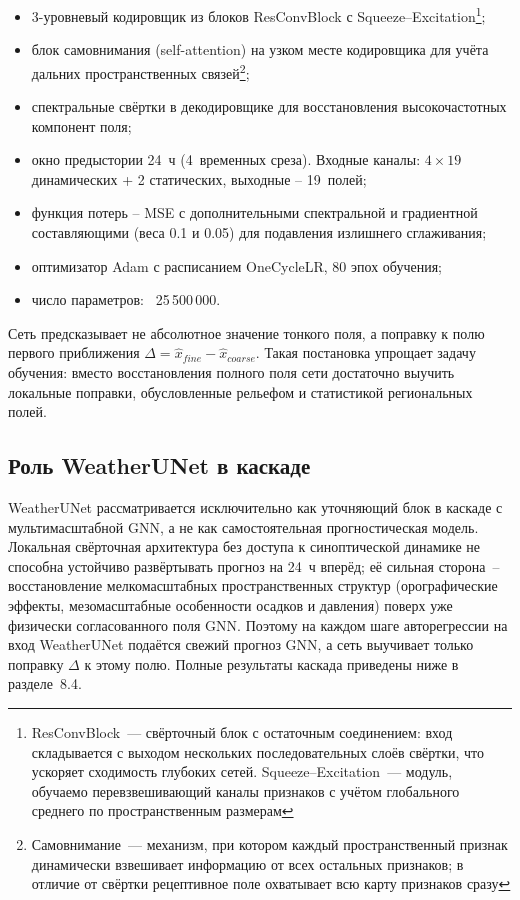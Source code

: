 \documentclass[14pt,a4paper]{extarticle}
\numberwithin{table}{section}
\numberwithin{figure}{section}
\numberwithin{equation}{section}
\providecommand{\tightlist}{%
  \setlength{\itemsep}{0pt}\setlength{\parskip}{0pt}}
\begin{document}
\begin{itemize}
\tightlist
\item
  3-уровневый кодировщик из блоков ResConvBlock с
  Squeeze--Excitation\footnote{ResConvBlock~--- свёрточный блок с
  остаточным соединением: вход складывается с выходом нескольких
  последовательных слоёв свёртки, что ускоряет сходимость глубоких
  сетей. Squeeze--Excitation~--- модуль, обучаемо перевзвешивающий
  каналы признаков с учётом глобального среднего по
  пространственным размерам};
\item
  блок самовнимания (self-attention) на узком месте кодировщика для
  учёта дальних пространственных связей\footnote{Самовнимание~---
  механизм, при котором каждый пространственный признак динамически
  взвешивает информацию от всех остальных признаков; в отличие от
  свёртки рецептивное поле охватывает всю карту признаков сразу};
\item
  спектральные свёртки в декодировщике для
  восстановления высокочастотных компонент поля;
\item
  окно предыстории 24~ч (4~временных среза). Входные каналы:
  $4 \times 19$ динамических + 2 статических, выходные -- 19~полей;
\item
  функция потерь -- MSE с дополнительными спектральной и градиентной
  составляющими (веса 0.1 и 0.05) для подавления излишнего
  сглаживания;
\item
  оптимизатор Adam с расписанием OneCycleLR, 80 эпох обучения;
\item
  число параметров: ~25\,500\,000.
\end{itemize}

Сеть предсказывает не абсолютное значение тонкого поля, а
поправку к полю первого приближения
$\Delta = \hat{x}_{fine} - \hat{x}_{coarse}$. Такая постановка
упрощает задачу обучения: вместо восстановления полного поля сети
достаточно выучить локальные поправки, обусловленные рельефом и
статистикой региональных полей.

\subsection{Роль WeatherUNet в каскаде}\label{ux430ux432ux442ux43eux43dux43eux43cux43dux44bux439-unet}

WeatherUNet рассматривается исключительно как уточняющий блок в каскаде
с мультимасштабной GNN, а не как самостоятельная прогностическая
модель. Локальная свёрточная архитектура без доступа к синоптической
динамике не способна устойчиво развёртывать прогноз на 24~ч вперёд;
её сильная сторона~-- восстановление мелкомасштабных пространственных
структур (орографические эффекты, мезомасштабные особенности осадков и
давления) поверх уже физически согласованного поля GNN. Поэтому на
каждом шаге авторегрессии на вход WeatherUNet подаётся свежий прогноз
GNN, а сеть выучивает только поправку $\Delta$ к этому полю. Полные
результаты каскада приведены ниже в разделе~8.4.
\end{document}
